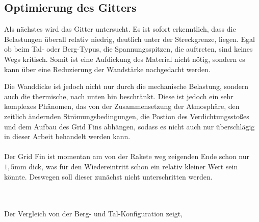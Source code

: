 \subsection{Optimierung des Gitters}
Als nächstes wird das Gitter untersucht. Es ist sofort erkenntlich, dass die Belastungen überall relativ niedrig, deutlich unter der Streckgrenze, liegen. Egal ob beim Tal- oder Berg-Typus, die Spannungsspitzen, die auftreten, sind keines Wegs kritisch. Somit ist eine Aufdickung des Material nicht nötig, sondern es kann über eine Reduzierung der Wandstärke nachgedacht werden.

Die Wanddicke ist jedoch nicht nur durch die mechanische Belastung, sondern auch die thermische, nach unten hin beschränkt. Diese ist jedoch ein sehr komplexes Phänomen, das von der Zusammensetzung der Atmosphäre, den zeitlich ändernden Strömungsbedingungen, die Postion des Verdichtungsstoßes und dem Aufbau des Grid Fins abhängen, sodass es nicht auch nur überschlägig in dieser Arbeit behandelt werden kann.
\\~\\
Der Grid Fin ist momentan am von der Rakete weg zeigenden Ende schon nur $1,5$mm dick, was für den Wiedereintritt schon ein relativ kleiner Wert sein könnte. Deswegen soll dieser zunächst nicht unterschritten werden.



~\\~\\
Der Vergleich von der Berg- und Tal-Konfiguration zeigt, 


